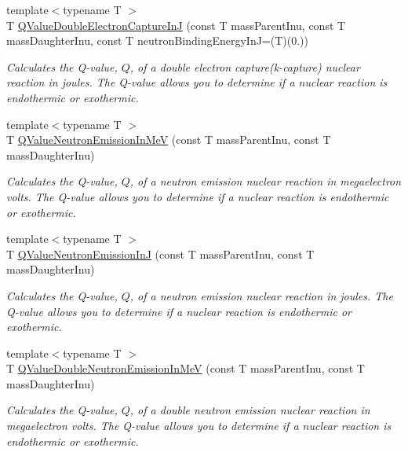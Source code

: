 \begin{DoxyCompactItemize}
{\footnotesize template$<$typename T $>$ }\\T \mbox{\hyperlink{group___e_g_x_phys-_q_value-_electron_capture_gacb431a07ac565f8e48a08c25544e5d22}{Q\+Value\+Double\+Electron\+Capture\+InJ}} (const T mass\+Parent\+Inu, const T mass\+Daughter\+Inu, const T neutron\+Binding\+Energy\+InJ=(T)(0.))
\begin{DoxyCompactList}\small\item\em Calculates the Q-\/value, $Q$, of a double electron capture(k-\/capture) nuclear reaction in joules. The Q-\/value allows you to determine if a nuclear reaction is endothermic or exothermic. \end{DoxyCompactList}\item 
{\footnotesize template$<$typename T $>$ }\\T \mbox{\hyperlink{group___e_g_x_phys-_q_value-_neutron_emission_ga8ad6e53cb04260eb9b140e22b5b6d9f6}{Q\+Value\+Neutron\+Emission\+In\+MeV}} (const T mass\+Parent\+Inu, const T mass\+Daughter\+Inu)
\begin{DoxyCompactList}\small\item\em Calculates the Q-\/value, $Q$, of a neutron emission nuclear reaction in megaelectron volts. The Q-\/value allows you to determine if a nuclear reaction is endothermic or exothermic. \end{DoxyCompactList}\item 
{\footnotesize template$<$typename T $>$ }\\T \mbox{\hyperlink{group___e_g_x_phys-_q_value-_neutron_emission_gacb17fa06731637937bc65765943d67ca}{Q\+Value\+Neutron\+Emission\+InJ}} (const T mass\+Parent\+Inu, const T mass\+Daughter\+Inu)
\begin{DoxyCompactList}\small\item\em Calculates the Q-\/value, $Q$, of a neutron emission nuclear reaction in joules. The Q-\/value allows you to determine if a nuclear reaction is endothermic or exothermic. \end{DoxyCompactList}\item 
{\footnotesize template$<$typename T $>$ }\\T \mbox{\hyperlink{group___e_g_x_phys-_q_value-_neutron_emission_gaeafae8a98e46b701517c1a2b8bfc241d}{Q\+Value\+Double\+Neutron\+Emission\+In\+MeV}} (const T mass\+Parent\+Inu, const T mass\+Daughter\+Inu)
\begin{DoxyCompactList}\small\item\em Calculates the Q-\/value, $Q$, of a double neutron emission nuclear reaction in megaelectron volts. The Q-\/value allows you to determine if a nuclear reaction is endothermic or exothermic. \end{DoxyCompactList}\item 

\end{DoxyCompactItemize}
